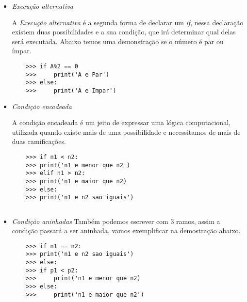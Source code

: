 			 \begin{itemize}
			 	\item \textit{Execução alternativa}
			 	
			 	 A \textit{Execução alternativa} é a segunda forma de declarar um \textit{if}, nessa declaração existem duas possibilidades e a sua condição, que irá determinar qual delas será executada. Abaixo temos uma demonstração se o número é par ou ímpar.
			 	 \begin{lstlisting}
	>>> if A%2 == 0
	>>>		print('A e Par')
	>>> else:
	>>>		print('A e Impar')

			 	 \end{lstlisting}
				\item \textit{Condição encadeada}
				
				A condição encadeada é um jeito de expressar uma lógica computacional, utilizada quando existe mais de uma possibilidade e necessitamos de mais de duas ramificações. 
				
				\begin{lstlisting}
	>>> if n1 < n2:
	>>>	print('n1 e menor que n2')
	>>> elif n1 > n2:
	>>>	print('n1 e maior que n2)
	>>> else:
	>>>	print('n1 e n2 sao iguais')
					
				\end{lstlisting}
			
				\item \textit{Condição aninhadas}
				Também podemos escrever com 3 ramos, assim a condição passará a ser aninhada, vamos exemplificar na demostração abaixo.
					\begin{lstlisting}
	>>> if n1 == n2:
	>>>	print('n1 e n2 sao iguais')
	>>> else:
	>>>	if p1 < p2:	
	>>>	    print('n1 e menor que n2)
	>>>	else:
	>>>	    print('n1 e maior que n2')
					
				\end{lstlisting}
			 \end{itemize}
			  
